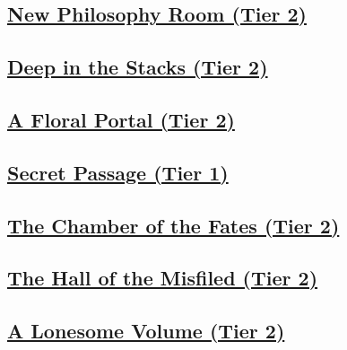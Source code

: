 \documentclass[sheet]{GL2020}
\begin{document}
\begin{center}\section*{\underline{New Philosophy Room (Tier 2)}}\end{center}
\label{NewPhilosophy}

\clearpage

\begin{center}\section*{\underline{Deep in the Stacks (Tier 2)}}\end{center}
\label{DeepStacks}

\clearpage

\begin{center}\section*{\underline{A Floral Portal (Tier 2)}}\end{center}
\label{FloralPortal}

\clearpage

\begin{center}\section*{\underline{Secret Passage (Tier 1)}}\end{center}
\label{SecretPassage}

\clearpage

\begin{center}\section*{\underline{The Chamber of the Fates (Tier 2)}}\end{center}
\label{ChamberoftheFates}

\clearpage

\begin{center}\section*{\underline{The Hall of the Misfiled (Tier 2)}}\end{center}
\label{HallMisfiled}

\clearpage

\begin{center}\section*{\underline{A Lonesome Volume (Tier 2)}}\end{center}
\label{LonesomeVolume}
\end{document}
